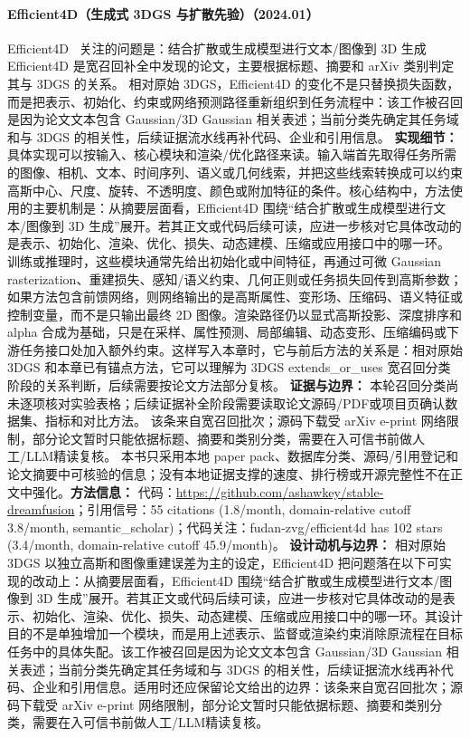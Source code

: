 \paragraph{Efficient4D（生成式 3DGS 与扩散先验）（2024.01）}
Efficient4D~\cite{2401_08742} 关注的问题是：结合扩散或生成模型进行文本/图像到 3D 生成 Efficient4D 是宽召回补全中发现的论文，主要根据标题、摘要和 arXiv 类别判定其与 3DGS 的关系。
相对原始 3DGS，Efficient4D 的变化不是只替换损失函数，而是把表示、初始化、约束或网络预测路径重新组织到任务流程中：该工作被召回是因为论文文本包含 Gaussian/3D Gaussian 相关表述；当前分类先确定其任务域和与 3DGS 的相关性，后续证据流水线再补代码、企业和引用信息。
\textbf{实现细节：} 具体实现可以按输入、核心模块和渲染/优化路径来读。输入端首先取得任务所需的图像、相机、文本、时间序列、语义或几何线索，并把这些线索转换成可以约束高斯中心、尺度、旋转、不透明度、颜色或附加特征的条件。核心结构中，方法使用的主要机制是：从摘要层面看，Efficient4D 围绕“结合扩散或生成模型进行文本/图像到 3D 生成”展开。若其正文或代码后续可读，应进一步核对它具体改动的是表示、初始化、渲染、优化、损失、动态建模、压缩或应用接口中的哪一环。 训练或推理时，这些模块通常先给出初始化或中间特征，再通过可微 Gaussian rasterization、重建损失、感知/语义约束、几何正则或任务损失回传到高斯参数；如果方法包含前馈网络，则网络输出的是高斯属性、变形场、压缩码、语义特征或控制变量，而不是只输出最终 2D 图像。渲染路径仍以显式高斯投影、深度排序和 alpha 合成为基础，只是在采样、属性预测、局部编辑、动态变形、压缩编码或下游任务接口处加入额外约束。这样写入本章时，它与前后方法的关系是：相对原始 3DGS 和本章已有锚点方法，它可以理解为 3DGS extends\_or\_uses 宽召回分类阶段的关系判断，后续需要按论文方法部分复核。
\textbf{证据与边界：} 本轮召回分类尚未逐项核对实验表格；后续证据补全阶段需要读取论文源码/PDF或项目页确认数据集、指标和对比方法。 该条来自宽召回批次；源码下载受 arXiv e-print 网络限制，部分论文暂时只能依据标题、摘要和类别分类，需要在入可信书前做人工/LLM精读复核。 本书只采用本地 paper pack、数据库分类、源码/引用登记和论文摘要中可核验的信息；没有本地证据支撑的速度、排行榜或开源完整性不在正文中强化。\textbf{方法信息：} 代码：\url{https://github.com/ashawkey/stable-dreamfusion}；引用信号：55 citations (1.8/month, domain-relative cutoff 3.8/month, semantic\_scholar)；代码关注：fudan-zvg/efficient4d has 102 stars (3.4/month, domain-relative cutoff 45.9/month)。
\textbf{设计动机与边界：} 相对原始 3DGS 以独立高斯和图像重建误差为主的设定，Efficient4D 把问题落在以下可实现的改动上：从摘要层面看，Efficient4D 围绕“结合扩散或生成模型进行文本/图像到 3D 生成”展开。若其正文或代码后续可读，应进一步核对它具体改动的是表示、初始化、渲染、优化、损失、动态建模、压缩或应用接口中的哪一环。其设计目的不是单独增加一个模块，而是用上述表示、监督或渲染约束消除原流程在目标任务中的具体失配。该工作被召回是因为论文文本包含 Gaussian/3D Gaussian 相关表述；当前分类先确定其任务域和与 3DGS 的相关性，后续证据流水线再补代码、企业和引用信息。适用时还应保留论文给出的边界：该条来自宽召回批次；源码下载受 arXiv e-print 网络限制，部分论文暂时只能依据标题、摘要和类别分类，需要在入可信书前做人工/LLM精读复核。
